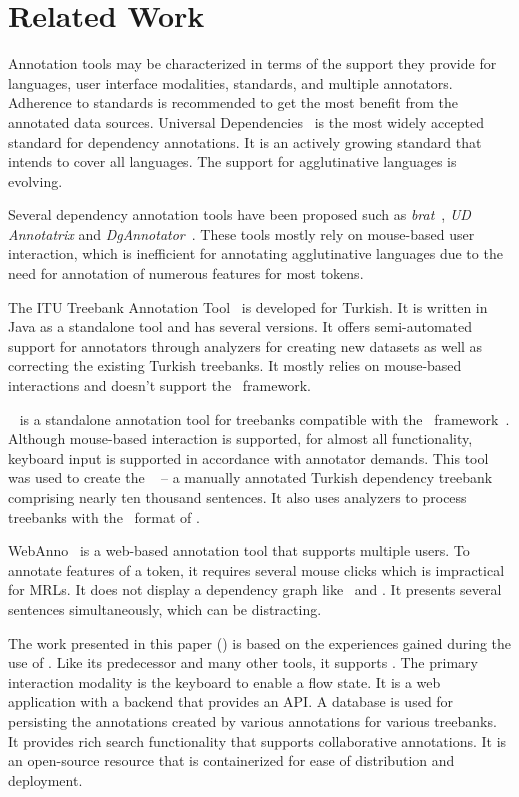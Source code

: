 \section{Related Work}
\label{sec:related}

Annotation tools may be characterized in terms of the support they provide for languages, user interface modalities, standards, and multiple annotators.
Adherence to standards is recommended to get the most benefit from the annotated data sources.
Universal Dependencies~\cite{UD} is the most widely accepted standard for dependency annotations.
It is an actively growing standard that intends to cover all languages.
The support for agglutinative languages is evolving.

Several dependency annotation tools have been proposed such as \textit{brat}~\cite{brat}, \textit{UD Annotatrix} and \textit{DgAnnotator}~\cite{UD-tools}.
These tools mostly rely on mouse-based user interaction, which is inefficient for annotating agglutinative languages due to the need for annotation of numerous features for most tokens.

The ITU Treebank Annotation Tool~\cite{pamay-etal-2015-annotation} is developed for Turkish.
It is written in Java as a standalone tool and has several versions.
It offers semi-automated support for annotators through analyzers for creating new datasets as well as correcting the existing Turkish treebanks.
It mostly relies on mouse-based interactions and doesn't support the \ud\ framework.

\boatvone~\cite{turk-etal-2019-turkish} is a standalone annotation tool for treebanks compatible with the \ud\ framework~\cite{UD}.
Although mouse-based interaction is supported, for almost all functionality, keyboard input is supported in accordance with annotator demands.
This tool was used to create the \bountreebank~\cite{turk2021resources,UD-Boun-Treebank} -- a manually annotated Turkish dependency treebank comprising nearly ten thousand sentences.
It also uses analyzers to process treebanks with the \conllu\ format of \ud.

WebAnno~\cite{webanno} is a web-based annotation tool that supports multiple users.
To annotate features of a token, it requires several mouse clicks which is impractical for MRLs.
It does not display a dependency graph like \boatvone\ and \boatvtwo.
It presents several sentences simultaneously, which can be distracting.

The work presented in this paper (\boatvtwo) is based on the experiences gained during the use of \boatvone.
Like its predecessor and many other tools, it supports \ud.
The primary interaction modality is the keyboard to enable a flow state.
It is a web application with a backend that provides an API.
A database is used for persisting the annotations created by various annotations for various treebanks.
It provides rich search functionality that supports collaborative annotations.
It is an open-source resource that is containerized for ease of distribution and deployment.
